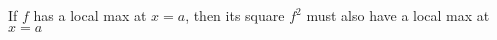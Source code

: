 \documentclass{ximera}
\author{Steven Gubkin}
\begin{document}
\begin{exercise}

	If $f$ has a local max at $x=a$, then its square $f^2$ must also have a local max at $x=a$
	\begin{multipleChoice}	
	\end{multipleChoice}

\end{exercise}
\end{document}

